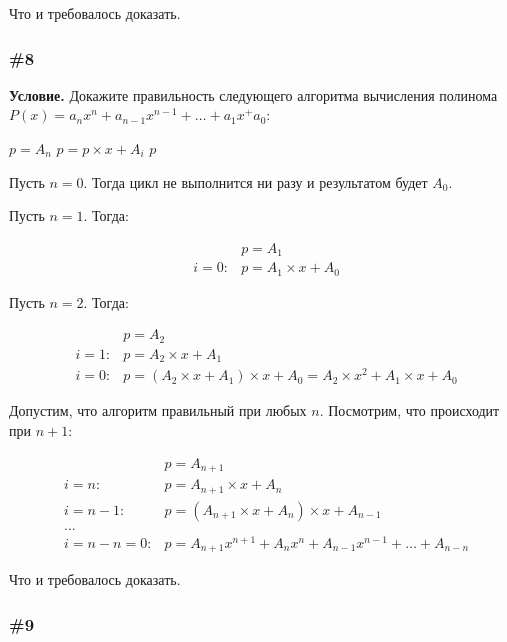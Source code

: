 \documentclass{article}
\begin{document}
Что и требовалось доказать.

\subsubsection{\#8}

\textbf{Условие.}
Докажите правильность следующего алгоритма вычисления полинома \(P(x) = a_nx^n + a_{n-1}x^{n-1} + \ldots + a_1x^ + a_0\):

\begin{algorithmic}[1]
        \State $p = A_n$
            \State $p = p \times x + A_i$
        \EndFor
        \State \Return $p$
    \EndFunction
\end{algorithmic}

Пусть \(n = 0\).
Тогда цикл не выполнится ни разу и результатом будет \(A_0\).

Пусть \(n = 1\).
Тогда:

\begin{eqnarray}
    &&p = A_1\\
    &i = 0: &p = A_1 \times x + A_0
\end{eqnarray}

Пусть \(n = 2\).
Тогда:

\begin{eqnarray}
    &&p = A_2\\
    &i = 1: &p = A_2 \times x + A_1\\
    &i = 0: &p = (A_2 \times x + A_1) \times x + A_0 = A_2 \times x^2 + A_1 \times x + A_0
\end{eqnarray}

Допустим, что алгоритм правильный при любых \(n\).
Посмотрим, что происходит при \(n+1\):

\begin{eqnarray}
    &&p = A_{n+1}\\
    &i = n: &p = A_{n+1} \times x + A_{n}\\
    &i = n-1: &p = (A_{n+1} \times x + A_{n}) \times x + A_{n-1}\\
    & \ldots &\\
    &i = n-n = 0: &p = A_{n+1}x^{n+1} + A_nx^n + A_{n-1}x^{n-1} + \ldots + A_{n-n}
\end{eqnarray}

Что и требовалось доказать.

\subsubsection{\#9}
\end{document}
